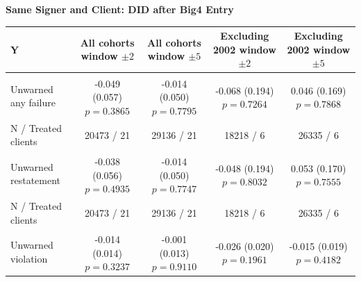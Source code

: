 \documentclass[10pt]{article}
\newcommand{\sym}[1]{\textsuperscript{#1}}
\begin{document}
\fontsize{10}{12}\selectfont\setlength{\parindent}{0pt}
\noindent\textbf{Same Signer and Client: DID after Big4 Entry}\par\medskip
\setlength{\tabcolsep}{3pt}\renewcommand{\arraystretch}{1.15}
\begin{tabular*}{\textwidth}{@{\extracolsep{\fill}}lcccc@{}}
\toprule
Y & \shortstack{All cohorts\\window $\pm2$} & \shortstack{All cohorts\\window $\pm5$} & \shortstack{Excluding 2002\\window $\pm2$} & \shortstack{Excluding 2002\\window $\pm5$} \\
\midrule
Unwarned any failure & \shortstack{-0.049\sym{}\\(0.057)\\$p=0.3865$} & \shortstack{-0.014\sym{}\\(0.050)\\$p=0.7795$} & \shortstack{-0.068\sym{}\\(0.194)\\$p=0.7264$} & \shortstack{0.046\sym{}\\(0.169)\\$p=0.7868$} \\
N / Treated clients & 20473 / 21 & 29136 / 21 & 18218 / 6 & 26335 / 6 \\ \addlinespace
Unwarned restatement & \shortstack{-0.038\sym{}\\(0.056)\\$p=0.4935$} & \shortstack{-0.014\sym{}\\(0.050)\\$p=0.7747$} & \shortstack{-0.048\sym{}\\(0.194)\\$p=0.8032$} & \shortstack{0.053\sym{}\\(0.170)\\$p=0.7555$} \\
N / Treated clients & 20473 / 21 & 29136 / 21 & 18218 / 6 & 26335 / 6 \\ \addlinespace
Unwarned violation & \shortstack{-0.014\sym{}\\(0.014)\\$p=0.3237$} & \shortstack{-0.001\sym{}\\(0.013)\\$p=0.9110$} & \shortstack{-0.026\sym{}\\(0.020)\\$p=0.1961$} & \shortstack{-0.015\sym{}\\(0.019)\\$p=0.4182$} \\

\end{tabular*}
\end{document}
